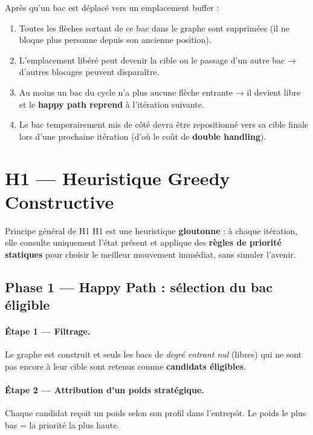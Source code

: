 \documentclass[12pt,a4paper]{article}
\begin{document}
Après qu'un bac est déplacé vers un emplacement buffer :

\begin{enumerate}[noitemsep]
  \item Toutes les flèches sortant de ce bac dans le graphe sont supprimées
        (il ne bloque plus personne depuis son ancienne position).
  \item L'emplacement libéré peut devenir la cible ou le
        passage d'un autre bac → d'autres blocages peuvent
        disparaître.
  \item Au moins un bac du cycle n'a plus aucune flèche entrante →
        il devient libre et le \textbf{happy path reprend} à l'itération
        suivante.
  \item Le bac temporairement mis de côté devra être repositionné vers sa cible finale
        lors d'une prochaine itération (d'où le coût de
        \textbf{double handling}).
\end{enumerate}




\section{H1 — Heuristique Greedy Constructive}

\begin{boxH1}{Principe général de H1}
H1 est une heuristique \textbf{gloutonne} : à chaque itération, elle
consulte uniquement l'état présent et applique des \textbf{règles de
priorité statiques} pour choisir le meilleur mouvement immédiat,
sans simuler l'avenir.
\end{boxH1}

\subsection{Phase 1 — Happy Path : sélection du bac éligible}

\paragraph{Étape 1 — Filtrage.}
Le graphe est construit et seuls les bacs de \emph{degré entrant nul}
(libres) qui ne sont pas encore à leur cible sont retenus comme
\textbf{candidats éligibles}.

\paragraph{Étape 2 — Attribution d'un poids stratégique.}
Chaque candidat reçoit un poids selon son profil dans l'entrepôt.
Le poids le plus bas = la priorité la plus haute.
\end{document}
